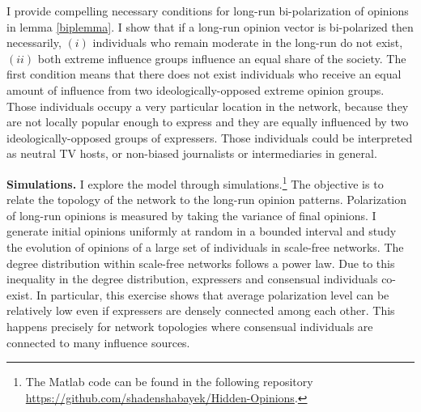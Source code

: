 \documentclass{article}
\begin{document}
I provide compelling necessary conditions for long-run bi-polarization of opinions in lemma \ref{biplemma}. I show that if a long-run opinion vector is bi-polarized then necessarily, $(i)$ individuals who remain moderate in the long-run do not exist, $(ii)$ both extreme influence groups influence an equal share of the society. The first condition means that there does not exist individuals who receive an equal amount of influence from two ideologically-opposed extreme opinion groups. Those individuals occupy a very particular location in the network, because they are not locally popular enough to express and they are equally influenced by two ideologically-opposed groups of expressers. Those individuals could be interpreted as neutral TV hosts, or non-biased journalists or intermediaries in general.

{\bf Simulations.} I explore the model through simulations.\footnote{The Matlab code can be found in the following repository \href{https://github.com/shadenshabayek/Hidden-Opinions}{https://github.com/shadenshabayek/Hidden-Opinions}. } The objective is to relate the topology of the network to the long-run opinion patterns. Polarization of long-run opinions is measured by taking the variance of final opinions. I generate initial opinions uniformly at random in a bounded interval and study the evolution of opinions of a large set of individuals in scale-free networks. The degree distribution within scale-free networks follows a power law. Due to this inequality in the degree distribution, expressers and consensual individuals co-exist. %
In particular, this exercise shows that average polarization level can be relatively low even if expressers are densely connected among each other. This happens precisely for network topologies where consensual individuals are connected to many influence sources.
\end{document}
